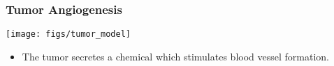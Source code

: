 \begin{frame}[t]
  \frametitle{Tumor Angiogenesis}
  \begin{center}
    \texttt{[image: figs/tumor\_model]}    
  \end{center}

  \begin{block}{}
    \begin{itemize}
    \item{%
      The tumor secretes
      a chemical which stimulates blood vessel formation.
      }
      \end{itemize}
  \end{block}
\end{frame}


